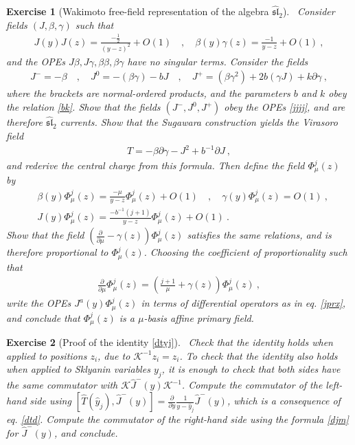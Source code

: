 \documentclass[12pt,a4paper,notitlepage]{report}
\numberwithin{equation}{section}
\theoremstyle{break}
\newtheorem{exo}{Exercise}[chapter]
\begin{document}
\begin{exo}[Wakimoto free-field representation of the algebra $\widehat{\mathfrak{sl}}_2$]
 ~\label{exowaki}
Consider fields $(J,\beta,\gamma)$ such that 
\begin{align}
 J(y)J(z) = \frac{-\frac12}{(y-z)^2} + O(1) \quad , \quad \beta(y)\gamma(z) = \frac{-1}{y-z} + O(1)\ ,
\end{align}
and the OPEs $J\beta,J\gamma,\beta\beta,\beta\gamma$ have no singular terms.
Consider the fields 
\begin{align}
 J^- = -\beta \quad , \quad J^0 = -(\beta\gamma) - bJ \quad , \quad J^+ = (\beta\gamma^2)+2b(\gamma J)+k\partial\gamma\ ,
\end{align}
where the brackets are normal-ordered products, and the parameters $b$ and $k$ obey the relation \eqref{bk}.
Show that the fields $(J^-,J^0,J^+)$ obey the OPEs \eqref{jjjj}, and are therefore $\widehat{\mathfrak{sl}}_2$ currents. 
Show that the Sugawara construction yields the Virasoro field
\begin{align}
 T = -\beta \partial\gamma - J^2 +b^{-1}\partial J\ ,
\end{align}
and rederive the central charge from this formula.
Then define the field $\Phi^j_\mu(z)$ by 
\begin{align}
 & \beta(y)\Phi^j_\mu(z) = \frac{-\mu}{y-z}\Phi^j_\mu(z)+ O(1) \quad , \quad \gamma(y)\Phi^j_\mu(z)=O(1)\ , 
\\
 & J(y)\Phi^j_\mu(z) = \frac{-b^{-1}(j+1)}{y-z}\Phi^j_\mu(z)+ O(1)\ .
\end{align}
Show that the field $\left({\frac{\partial}{\partial \mu}}-\gamma(z)\right)\Phi^j_\mu(z)$ satisfies the same relations, and is therefore proportional to $\Phi^j_\mu(z)$.
Choosing the coefficient of proportionality such that
\begin{align}
 {\frac{\partial}{\partial \mu}}\Phi^j_\mu(z) =\left(\frac{j+1}{\mu}+\gamma(z)\right)\Phi^j_\mu(z)\ ,
\end{align}
write the OPEs $J^a(y)\Phi^j_\mu(z)$ in terms of differential operators as in eq. \eqref{jprx}, and conclude that $\Phi^j_\mu(z)$ is a $\mu$-basis affine primary field.
\end{exo}

\begin{exo}[Proof of the identity \eqref{dtyj}]
 ~\label{exoktk}
Check that the identity holds when applied to positions $z_i$, due to $\mathcal{K}^{-1}z_i = z_i$. 
To check that the identity also holds when applied to Sklyanin variables $y_j$, it is enough to check 
that both sides have the same commutator with $\mathcal{K}\hat{J}^-(y)\mathcal{K}^{-1}$. 
Compute the commutator of the left-hand side using $[\hat{T}(\hat{y}_j),\hat{J}^-(y)]={\frac{\partial}{\partial y}}\frac{1}{y-\hat{y}_j}\hat{J}^-(y)$, which is a consequence of eq. \eqref{dtd}.
Compute the commutator of the 
right-hand side using the formula \eqref{djm} for $\hat{J}^-(y)$, and conclude.
\end{exo}

\printindex




%
\end{document}
